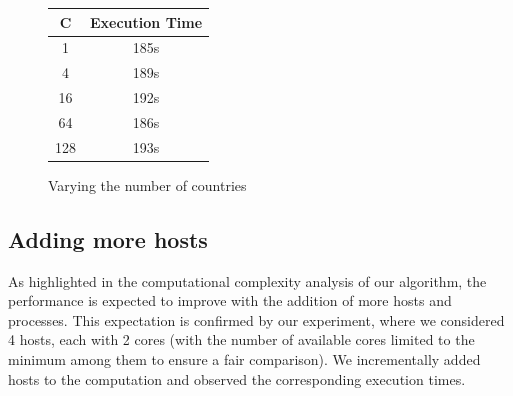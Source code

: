 \documentclass[11pt]{article}
\begin{document}
\begin{figure}[h]
\caption{Varying the number of countries}
\label{fig:countries}
\vspace{4pt}
\begin{minipage}{0.5\textwidth}
  \centering
  \begin{tabular}{|c|c|}
    \hline
    \textbf{C} & \textbf{Execution Time} \\
    \hline
    1 &  185s\\ 
    4 &  189s\\ 
    16 &  192s\\ 
    64 &  186s\\
    128 & 193s\\
    \hline
  \end{tabular}
\end{minipage}%
\centering
\begin{minipage}{0.5\textwidth}
    \end{minipage}
\end{figure}

\subsection{Adding more hosts}
\label{subsec:hosts}
As highlighted in the computational complexity analysis of our algorithm, the performance is expected to improve with the addition of more hosts and processes. This expectation is confirmed by our experiment, where we considered 4 hosts, each with 2 cores (with the number of available cores limited to the minimum among them to ensure a fair comparison). We incrementally added hosts to the computation and observed the corresponding execution times.
\end{document}
